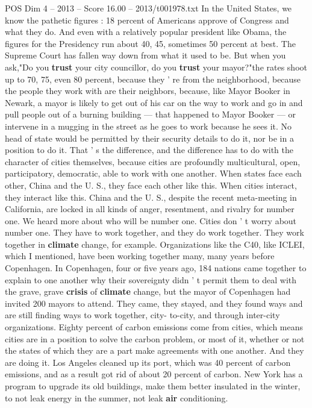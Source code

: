 \begin{textsample}{POS Dim 4 – 2013 – Score 16.00 – 2013/t001978.txt}
In the United States, we know the pathetic figures : 18 percent of Americans approve of Congress and what they do.
And even with a relatively popular president like Obama, the figures for the Presidency run about 40, 45, sometimes 50 percent at best.
The Supreme Court has fallen way down from what it used to be.
But when you ask,"Do you \textbf{trust} your city councillor, do you \textbf{trust} your mayor?"the rates shoot up to 70, 75, even 80 percent, because they ' re from the neighborhood, because the people they work with are their neighbors, because, like Mayor Booker in Newark, a mayor is likely to get out of his car on the way to work and go in and pull people out of a burning building — that happened to Mayor Booker — or intervene in a mugging in the street as he goes to work because he sees it.
No head of state would be permitted by their security details to do it, nor be in a position to do it.
That ' s the difference, and the difference has to do with the character of cities themselves, because cities are profoundly multicultural, open, participatory, democratic, able to work with one another.
When states face each other, China and the U.
S., they face each other like this.
When cities interact, they interact like this.
China and the U.
S., despite the recent meta-meeting in California, are locked in all kinds of anger, resentment, and rivalry for number one.
We heard more about who will be number one.
Cities don ' t worry about number one.
They have to work together, and they do work together.
They work together in \textbf{climate} change, for example.
Organizations like the C40, like ICLEI, which I mentioned, have been working together many, many years before Copenhagen.
In Copenhagen, four or five years ago, 184 nations came together to explain to one another why their sovereignty didn ' t permit them to deal with the grave, grave \textbf{crisis} of \textbf{climate} change, but the mayor of Copenhagen had invited 200 mayors to attend.
They came, they stayed, and they found ways and are still finding ways to work together, city- to-city, and through inter-city organizations.
Eighty percent of carbon emissions come from cities, which means cities are in a position to solve the carbon problem, or most of it, whether or not the states of which they are a part make agreements with one another.
And they are doing it.
Los Angeles cleaned up its port, which was 40 percent of carbon emissions, and as a result got rid of about 20 percent of carbon.
New York has a program to upgrade its old buildings, make them better insulated in the winter, to not leak energy in the summer, not leak \textbf{air} conditioning.

\end{textsample}

